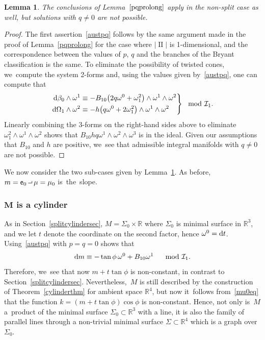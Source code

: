 \documentclass[10pt,a4paper]{amsart}
\def\R{\mathbb{R}}
\def\ve{\mathsf{e}}
\def\II{\operatorname{II}} %
\def\calI{\mathcal{I}}
\def\w{\omega}
\newcommand{\intprod}{\mathbin{\raisebox{.4ex}{\hbox{\vrule height .5pt width 5pt depth 0pt \vrule height 3pt width .5pt depth 0pt}}}}
\newtheorem{Lemma}[Theorem]{Lemma}
\numberwithin{equation}{section}
\begin{document}
\begin{Lemma} \label{non-split-cases}
The conclusions of Lemma~$\ref{pqprolong}$ apply in the non-split case as well, but solutions with $q\ne 0$ are not possible.
\end{Lemma}
\begin{proof}
The first assertion~\eqref{austpq} follows by the same argument made in the proof of Lemma~\ref{pqprolong} for the case where $|\II|$ is 1-dimensional,
and the correspondence between the values of $p$, $q$ and the branches of the Bryant classification is the same. To eliminate the possibility of twisted cones, we~compute the system 2-forms and, using the values given by~\eqref{austpq}, one can compute that
\begin{gather*}
\left.
\begin{aligned}
{\rm d}\beta_0 \wedge \w^1 &\equiv -B_{10} \big(2q\w^0 +\w^2_1\big) \wedge \w^1 \wedge \w^2 \\
{\rm d}\Omega_1 \wedge \w^2 &\equiv -h\big(q\w^0+2\w^2_1\big) \wedge \w^1 \wedge \w^2
\end{aligned}\right\} \mod \calI_1.
\end{gather*}
Linearly combining the 3-forms on the right-hand sides above to eliminate $\w^2_1 \wedge \w^1 \wedge \w^2$ shows that $B_{10} h q \w^1 \wedge \w^2 \wedge \w^3$ is in the ideal. Given our assumptions that $B_{10}$ and $h$ are positive, we~see that admissible integral manifolds with $q\ne 0$ are not possible.
\end{proof}

We now consider the two sub-cases given by Lemma~\ref{non-split-cases}. As before, $m = \ve_0 \intprod \mu = \mu_0$ is~the~slope.

\subsubsection[M is a cylinder]{$\boldsymbol M$ is a cylinder}

As in Section~\ref{splitcylindersec}, $M = \Sigma_0 \times\R$ where $\Sigma_0$ is minimal surface in $\R^3$, and we let $t$ denote the coordinate on the second factor, hence $\w^0 = {\rm d}t$. Using~\eqref{austpq} with $p=q=0$ shows that
\begin{gather} \label{nonsplitcylinderdm}
{\rm d}m \equiv -\tan \phi\, \w^0 + B_{10}\w^1 \quad \mod \calI_1.
\end{gather}
Therefore, we~see that now $m + t\tan \phi$ is non-constant, in contrast to Section~\ref{splitcylindersec}. Nevertheless,~$M$ is still described by the construction of Theorem~\ref{cylinderthm} for ambient space $\R^4$, but now it~follows from~\eqref{mu0eq} that the function $k=( m + t \tan \phi) \cos \phi$ is non-constant. Hence, not only is~$M$ a~product of the minimal surface $\Sigma_0 \subset \R^3$ with a line, it is also the family of parallel lines through a non-trivial minimal surface $\Sigma \subset \R^4$ which is a graph over $\Sigma_0$.
\end{document}

